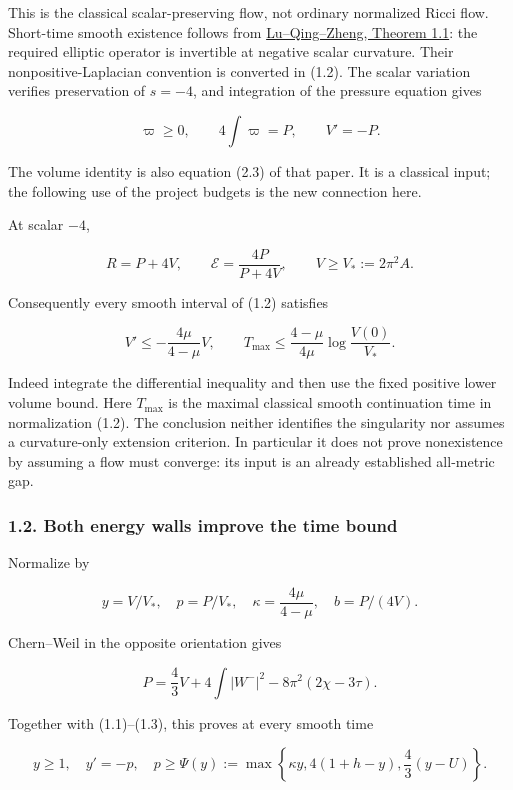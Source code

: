 \documentclass[
  10pt,
]{article}
\begin{document}
This is the classical scalar-preserving flow, not ordinary normalized
Ricci flow. Short-time smooth existence follows from
\href{https://arxiv.org/pdf/1109.5377}{Lu--Qing--Zheng, Theorem 1.1}:
the required elliptic operator is invertible at negative scalar
curvature. Their nonpositive-Laplacian convention is converted in (1.2).
The scalar variation verifies preservation of \(s=-4\), and integration
of the pressure equation gives

\[
 \varpi\ge0,\qquad 4\int\varpi=P,
 \qquad \boxed{V'=-P.}                              \tag{1.3}
\]

The volume identity is also equation (2.3) of that paper. It is a
classical input; the following use of the project budgets is the new
connection here.

At scalar \(-4\),

\[
 R=P+4V,\qquad \mathcal E=\frac{4P}{P+4V},\qquad
 V\ge V_*:=2\pi^2A.
\]

Consequently every smooth interval of (1.2) satisfies

\[
 V'\le-\frac{4\mu}{4-\mu}V,
 \qquad
 \boxed{T_{\max}\le\frac{4-\mu}{4\mu}
                      \log\frac{V(0)}{V_*}.}        \tag{1.4}
\]

Indeed integrate the differential inequality and then use the fixed
positive lower volume bound. Here \(T_{\max}\) is the maximal classical
smooth continuation time in normalization (1.2). The conclusion neither
identifies the singularity nor assumes a curvature-only extension
criterion. In particular it does not prove nonexistence by assuming a
flow must converge: its input is an already established all-metric gap.

\hypertarget{both-energy-walls-improve-the-time-bound}{%
\subsubsection{1.2. Both energy walls improve the time
bound}\label{both-energy-walls-improve-the-time-bound}}

Normalize by

\[
 y=V/V_*,\quad p=P/V_*,\quad
 \kappa=\frac{4\mu}{4-\mu},\quad b=P/(4V).
\]

Chern--Weil in the opposite orientation gives

\[
 P=\frac43V+4\int|W^-|^2-8\pi^2(2\chi-3\tau).
\]

Together with (1.1)--(1.3), this proves at every smooth time

\[
 \boxed{y\ge1,\quad y'=-p,\quad
 p\ge\Psi(y):=\max\left\{\kappa y,
                   4(1+h-y),\frac43(y-U)\right\}.}   \tag{1.5}
\]
\end{document}
